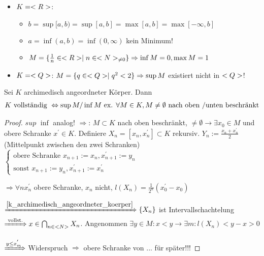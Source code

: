 \begin{example}
	\begin{itemize}
		\item $K=\real$:
			\begin{itemize}
				\item $b = \sup[a,b) = \sup[a,b] = \max[a,b] = \max[-\infty,b]$
				\item $a = \inf(a,b) = \inf(0,\infty)$ kein Minimum!
				\item $M = \{\frac{1}{n} \in \real \mid n \in \natur_{\neq 0}\} \Rightarrow \inf M = 0, \max M = 1$
			\end{itemize}
		\item $K = \ratio$: 
		$M = \{q \in \ratio \mid q^2 <2\} \Rightarrow \sup M$ existiert nicht in $\ratio$!
	\end{itemize}
\end{example}

\begin{theorem}
	Sei $K$ archimedisch angeordneter Körper. Dann
	\begin{align}
	K \text{ vollständig } \Leftrightarrow \sup M \slash \inf M \text{ ex. }\forall M\in K, M\neq \emptyset \text{ nach oben \slash unten beschränkt}\notag
	\end{align}
\end{theorem}

\begin{proof}
	$sup$ $\inf$ analog!
	$\Rightarrow$: $M \subset K$ nach oben beschränkt, $\neq \emptyset \to \exists x_0 \in M$ und obere Schranke $x^{'} \in K$. Definiere $X_n = [x_n, x_n^{'}] \subset K$ rekursiv.
	$Y_n := \frac{x_n + x_n^{'}}{2}$ (Mittelpunkt zwischen den zwei Schranken)$\begin{cases}
	\text{obere Schranke }x_{n+1}:= x_n, x_{n+1}^{'} := y_n\\
	\text{sonst } x_{n+1}:= y_n, x_{n+1}^{'} := x_n^{'}
	\end{cases}$
	
	$\Rightarrow \forall n x_n^{'}$ obere Schranke, $x_n$ nicht, $l(X_n) = \frac{1}{2^n}(x_0^{'}-x_0)$
	
	$\xRightarrow{\ref{k_archimedisch_angeordneter_koerper}} \{X_n\}$ ist Intervallschachtelung $\xRightarrow{\text{ vollst.}} x \in \bigcap_{n\in\mathbb{N}} X_n$. Angenommen $\exists y \in M\colon x < y \to \exists m: l(X_n) < y - x > 0$
	
	$\xRightarrow{y \le x_m^{'}}$ Widerspruch $\Rightarrow$ obere Schranke von ... für später!!!
\end{proof}

